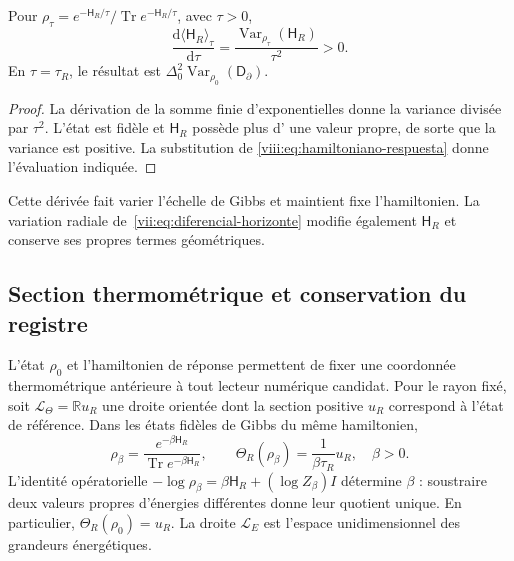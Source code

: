 \begin{corollary}
\label{viii:cor:respuesta-escala-termica}
Pour \(\rho_\tau=e^{-\mathsf H_R/\tau}/
\operatorname{Tr}e^{-\mathsf H_R/\tau}\), avec \(\tau>0\),
\begin{equation}
 \frac{\mathrm d\langle\mathsf H_R\rangle_\tau}{\mathrm d\tau}
 =\frac{\operatorname{Var}_{\rho_\tau}(\mathsf H_R)}{\tau^2}>0.
 \label{viii:eq:susceptibilidad-termica}
\end{equation}
En \(\tau=\tau_R\), le résultat est
\(\Delta_0^2\operatorname{Var}_{\rho_0}(\mathsf D_\partial)\).
\end{corollary}
\begin{proof}
La dérivation de la somme finie d'exponentielles donne la variance divisée
par \(\tau^2\). L'état est fidèle et \(\mathsf H_R\) possède plus d'
une valeur propre, de sorte que la variance est positive. La substitution de
\eqref{viii:eq:hamiltoniano-respuesta} donne l'évaluation indiquée.
\end{proof}

Cette dérivée fait varier l'échelle de Gibbs et maintient fixe l'hamiltonien.
La variation radiale de~\eqref{vii:eq:diferencial-horizonte} modifie
également \(\mathsf H_R\) et conserve ses propres termes géométriques.

\subsection{Section thermométrique et conservation du registre}
\label{viii:subsec:seccion-termometrica-registro}

L'état \(\rho_0\) et l'hamiltonien de réponse permettent de fixer une
coordonnée thermométrique antérieure à tout lecteur numérique candidat.
Pour le rayon fixé, soit \(\mathcal L_\Theta=\mathbb R u_R\) une
droite orientée dont la section positive \(u_R\) correspond à l'état
de référence. Dans les états fidèles de Gibbs du même hamiltonien,
\begin{equation}
 \rho_\beta=\frac{e^{-\beta\mathsf H_R}}
                  {\operatorname{Tr}e^{-\beta\mathsf H_R}},\qquad
 \Theta_R(\rho_\beta)=\frac{1}{\beta\tau_R}u_R,
 \quad \beta>0.
 \label{viii:eq:lector-termometrico}
\end{equation}
L'identité opératorielle \(-\log\rho_\beta=\beta\mathsf H_R+(\log Z_\beta)I\) détermine \(\beta\) : soustraire deux valeurs propres d'énergies différentes donne leur quotient unique. En particulier, \(\Theta_R(\rho_0)=u_R\). La droite \(\mathcal L_E\) est l'espace unidimensionnel des grandeurs énergétiques.

